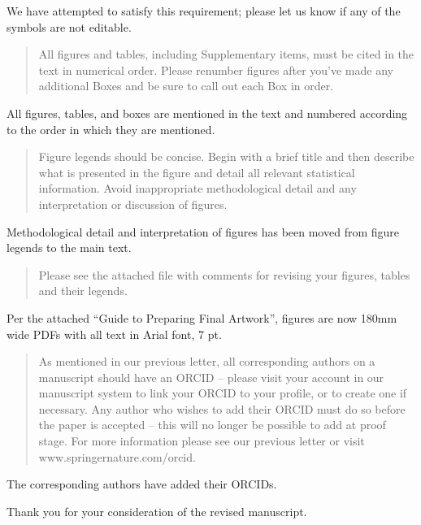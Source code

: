 \documentclass[10pt,stdletter,dateno]{newlfm}
\begin{document}
\begin{newlfm}
We have attempted to satisfy this requirement; please let us know if any of the symbols are not editable.

\begin{quote}
All figures and tables, including Supplementary items, must be cited in the text in numerical order. Please renumber figures after you’ve made any additional Boxes and be sure to call out each Box in order.
\end{quote}

All figures, tables, and boxes are mentioned in the text and numbered according to the order in which they are mentioned. 

\begin{quote}
Figure legends should be concise. Begin with a brief title and then describe what is presented in the figure and detail all relevant statistical information. Avoid inappropriate methodological detail and any interpretation or discussion of figures.
\end{quote}

Methodological detail and interpretation of figures has been moved from figure legends to the main text.

\begin{quote}
Please see the attached file with comments for revising your figures, tables and their legends.
\end{quote}

Per the attached ``Guide to Preparing Final Artwork'', figures are now 180mm wide PDFs with all text in Arial font, 7 pt. 
 
\begin{quote}
As mentioned in our previous letter, all corresponding authors on a manuscript should have an ORCID – please visit your account in our manuscript system to link your ORCID to your profile, or to create one if necessary. Any author who wishes to add their ORCID must do so before the paper is accepted – this will no longer be possible to add at proof stage. For more information please see our previous letter or visit www.springernature.com/orcid.
\end{quote}

The corresponding authors have added their ORCIDs. 

Thank you for your consideration of the revised manuscript.

\end{newlfm}
\end{document}
